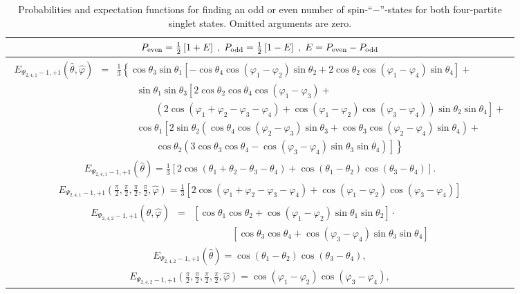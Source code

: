 \documentclass[pra,amsfonts,showpacs,showkeys,preprint]{revtex4}
\begin{document}
\begin{table}
\begin{tabular}{c}
\hline\hline
$
P_{ \rm even} =
{1\over2}\left[1 + E  \right]
\; ,\;
P_{\rm odd} =
{1\over2}\left[1 - E  \right]
\; ,\;
E=
P_{{\rm even}}
-
P_{{\rm odd}}
$
\\
\hline
$
\begin{array}{lll}
E_{{\Psi_{2,4,1}}-1,+1} ({\hat \theta} ,{\hat \varphi})  &=&
\frac{1}{3}
\left\{
\cos \theta_3 \sin \theta_1
\left[
-\cos \theta_4 \cos (\varphi_1 - \varphi_2) \sin \theta_2 +
          2 \cos \theta_2 \cos (\varphi_1 - \varphi_4) \sin \theta_4
\right] +
\right.
\\
&&\qquad
    \sin \theta_1 \sin \theta_3
\left[2 \cos \theta_2 \cos \theta_4 \cos (\varphi_1 - \varphi_3)  +
\right.
\\
&&\qquad
\qquad
\left.
\left(
2 \cos (\varphi_1 + \varphi_2 - \varphi_3 - \varphi_4) +
                \cos (\varphi_1 - \varphi_2)
                \cos (\varphi_3 - \varphi_4)
\right) \sin \theta_2 \sin \theta_4
\right]   +
\\
&&\qquad
    \cos \theta_1
\left[
2 \sin \theta_2
\left(
\cos \theta_4 \cos (\varphi_2 - \varphi_3) \sin \theta_3 +
                \cos \theta_3 \cos (\varphi_2 - \varphi_4) \sin \theta_4
\right) \right.
 +
\\
&&\qquad
\qquad
\left.
\left.
\cos \theta_2
\left(3 \cos \theta_3 \cos \theta_4 -
                \cos (\varphi_3 - \varphi_4) \sin \theta_3
\sin \theta_4
\right)
\right]
\right\}
\end{array}
$
\\
$E_{{\Psi_{2,4,1}}-1,+1} ({\hat \theta} )  =
\frac{1}{3} \left[2 \cos (\theta_1 +\theta_2 -\theta_3 -\theta_4 )+\cos
   (\theta_1 -\theta_2 ) \cos (\theta_3 -\theta_4 )\right].
$
\\
$
E_{{\Psi_{2,4,1}}-1,+1} ( \frac{\pi}{2},\frac{\pi}{2},\frac{\pi}{2},\frac{\pi}{2},\hat \varphi )=
\frac{1}{3} \left[2 \cos (\varphi_1+\varphi_2- \varphi_3 - \varphi_4)
+\cos (\varphi_1-\varphi_2) \cos (\varphi_3-\varphi_4)
\right]
$ \\
\hline
$
\begin{array}{lll}
E_{{\Psi_{2,4,2}}-1,+1}({\hat \theta} , {\hat \varphi } )  &=&
\left[\cos \theta_1 \cos \theta_2 +
          \cos ( \varphi_1 - \varphi_2) \sin \theta_1 \sin \theta_2\right]\cdot \\
&&\qquad  \qquad  \left[\cos \theta_3 \cos \theta_4 +
          \cos (\varphi_3 - \varphi_4) \sin \theta_3 \sin \theta_4
\right]
\end{array}
$
\\
$E_{{\Psi_{2,4,2}}-1,+1}({\hat \theta} )  =
\cos (\theta_1 -\theta_2 ) \cos (\theta_3 -\theta_4 ),
$
\\
$E_{{\Psi_{2,4,2}}-1,+1}( \frac{\pi}{2},\frac{\pi}{2},\frac{\pi}{2},\frac{\pi}{2},{\hat \varphi} )  =
\cos (\varphi_1 -\varphi_2 ) \cos (\varphi_3 -\varphi_4 ),
$
\\
\hline\hline
\end{tabular}
\caption{Probabilities and expectation functions
for finding an odd or even number of spin-``$-$''-states for both four-partite singlet states.
Omitted arguments are zero.
\label{2008-gtq-2part}
}
\end{table}
\end{document}
